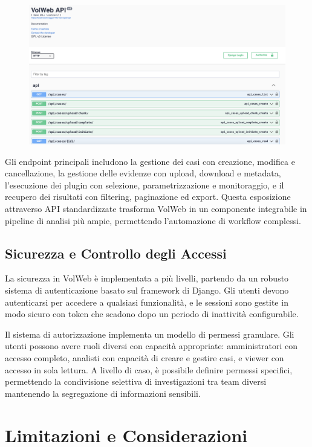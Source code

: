 \begin{figure}[H]
    \centering
    \includegraphics[width=1\linewidth]{images/volweb-original/volweb-swagger.png}
\end{figure}

Gli endpoint principali includono la gestione dei casi con creazione, modifica e cancellazione, la gestione delle evidenze con upload, download e metadata, l'esecuzione dei plugin con selezione, parametrizzazione e monitoraggio, e il recupero dei risultati con filtering, paginazione ed export. Questa esposizione attraverso API standardizzate trasforma VolWeb in un componente integrabile in pipeline di analisi più ampie, permettendo l'automazione di workflow complessi.

\subsection{Sicurezza e Controllo degli Accessi}

La sicurezza in VolWeb è implementata a più livelli, partendo da un robusto sistema di autenticazione basato sul framework di Django. Gli utenti devono autenticarsi per accedere a qualsiasi funzionalità, e le sessioni sono gestite in modo sicuro con token che scadono dopo un periodo di inattività configurabile.

Il sistema di autorizzazione implementa un modello di permessi granulare. Gli utenti possono avere ruoli diversi con capacità appropriate: amministratori con accesso completo, analisti con capacità di creare e gestire casi, e viewer con accesso in sola lettura. A livello di caso, è possibile definire permessi specifici, permettendo la condivisione selettiva di investigazioni tra team diversi mantenendo la segregazione di informazioni sensibili.
\section{Limitazioni e Considerazioni}

